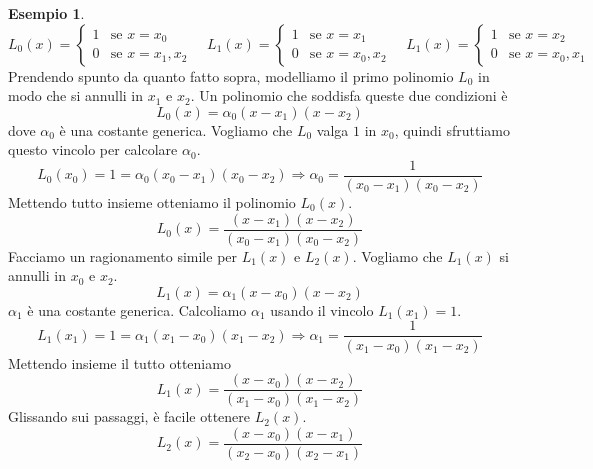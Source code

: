 \documentclass{article}
\theoremstyle{plain}
\theoremstyle{plain}
\theoremstyle{definition}
\theoremstyle{definition}
\newtheorem{esempio}{Esempio}
\begin{document}
\begin{esempio}
	\[
	L_{0}(x)=
	\begin{cases}
		1 & \text{se $x=x_{0}$} \\
		0 & \text{se $x=x_{1},x_{2}$}
	\end{cases}
	\quad
	L_{1}(x)=
	\begin{cases}
		1 & \text{se $x=x_{1}$} \\
		0 & \text{se $x=x_{0},x_{2}$}
	\end{cases}
	\quad
		L_{1}(x)=
	\begin{cases}
		1 & \text{se $x=x_{2}$} \\
		0 & \text{se $x=x_{0},x_{1}$}
	\end{cases}
	\]
	Prendendo spunto da quanto fatto sopra, modelliamo il primo polinomio $L_{0}$ in modo che si annulli in $x_{1}$ e $x_{2}$. Un polinomio che soddisfa queste due condizioni è 
	\[
	L_{0}(x)=\alpha_{0}(x-x_{1})(x-x_{2})
	\]
	dove $\alpha_{0}$ è una costante generica. Vogliamo che $L_{0}$ valga $1$ in $x_{0}$, quindi sfruttiamo questo vincolo per calcolare $\alpha_{0}$.
	\[
	L_{0}(x_{0})=1=\alpha_{0}(x_{0}-x_{1})(x_{0}-x_{2}) \Rightarrow \alpha_{0}=\frac{1}{(x_{0}-x_{1})(x_{0}-x_{2})}
	\]
	Mettendo tutto insieme otteniamo il polinomio $L_{0}(x)$.
	\[
		L_{0}(x)=\frac{(x-x_{1})(x-x_{2})}{(x_{0}-x_{1})(x_{0}-x_{2})}
	\]
	Facciamo un ragionamento simile per $L_{1}(x)$ e $L_{2}(x)$. Vogliamo che $L_{1}(x)$ si annulli in $x_{0}$ e $x_{2}$.
	\[
	L_{1}(x)=\alpha_{1}(x-x_{0})(x-x_{2})
	\]
	$\alpha_{1}$ è una costante generica. Calcoliamo $\alpha_{1}$ usando il vincolo $L_{1}(x_{1})=1$.
	\[
	L_{1}(x_{1})=1=\alpha_{1}(x_{1}-x_{0})(x_{1}-x_{2}) \Rightarrow \alpha_{1}=\frac{1}{(x_{1}-x_{0})(x_{1}-x_{2})}
	\]
	Mettendo insieme il tutto otteniamo
	\[
	L_{1}(x)=\frac{(x-x_{0})(x-x_{2})}{(x_{1}-x_{0})(x_{1}-x_{2})}
	\]
	Glissando sui passaggi, è facile ottenere $L_{2}(x)$.
	\[
	L_{2}(x)=\frac{(x-x_{0})(x-x_{1})}{(x_{2}-x_{0})(x_{2}-x_{1})}
	\]
\end{esempio}
\end{document}
